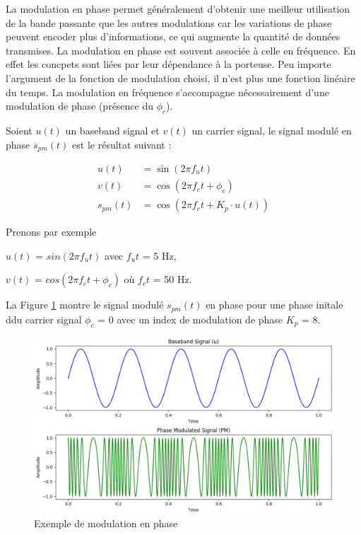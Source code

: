 La modulation en phase permet généralement d'obtenir une meilleur utilisation de la bande passante que les autres modulations car les variations de phase peuvent encoder plus d'informations, ce qui augmente la quantité de données transmises. La modulation en phase est souvent associée à celle en fréquence. En effet les concpets sont liées par leur dépendance à la porteuse. Peu importe l'argument de la fonction de modulation choisi, il n'est plus une fonction linéaire du temps. La modulation en fréquence s'accompagne nécessairement d'une modulation de phase (présence du $\phi_{c}$). 

Soient $u(t)$ un baseband signal et $v(t)$ un carrier signal, le signal modulé en phase $s_{pm}(t)$ est le résultat suivant :

\begin{align}
    u(t) &= \sin(2\pi f_{u}t) \\
    v(t) &= \cos(2\pi f_{c}t + \phi_{c}) \\
    s_{pm}(t) &= \cos\left(2\pi f_{c}t + K_{p} \cdot u(t)\right)
\end{align}

\vspace{0.1cm}

Prenons par exemple

\vspace{0.1cm}

$u(t)$ = $sin(2\pi f_{u}t)$ avec $f_{u}t$ = 5 Hz,

$v(t)$ = $cos(2\pi f_{c}t + \phi_{c})$ où $f_{c}t$ = 50 Hz.

\vspace{0.1cm}

La Figure \ref{term3} montre le signal modulé $s_{pm}(t)$ en phase pour une phase initale ddu carrier signal $\phi_{c}$ = 0 avec un index de modulation de phase $K_{p}$ = 8.

\newpage

\begin{figure}[h]
\centering

\includegraphics[scale=0.5]{images/PM_mod.PNG}
\caption{Exemple de modulation en phase}\label{term3}
\end{figure}

